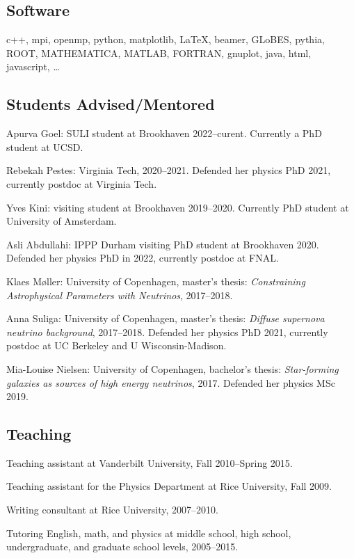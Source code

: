 \documentclass{article}
\renewenvironment{itemize}{
\begin{list}{}{
\setlength{\leftmargin}{.5em}}}{
\end{list}}
\begin{document}
\subsection*{Software}
\begin{itemize}
\item 
c++, mpi, openmp, python, matplotlib, \LaTeX, beamer, GLoBES, pythia, ROOT, MATHEMATICA, MATLAB, FORTRAN, gnuplot, java, html, javascript, \dots
\end{itemize}

\subsection*{Students Advised/Mentored}
\begin{itemize}
\item Apurva Goel: SULI student at Brookhaven 2022--curent.
Currently a PhD student at UCSD.
\item Rebekah Pestes: Virginia Tech, 2020--2021.
Defended her physics PhD 2021, currently postdoc at Virginia Tech.
\item Yves Kini: visiting student at Brookhaven 2019--2020.
Currently PhD student at University of Amsterdam.
\item Asli Abdullahi: IPPP Durham visiting PhD student at Brookhaven 2020.
Defended her physics PhD in 2022, currently postdoc at FNAL.
\item Klaes M\o ller: University of Copenhagen, master's thesis: \emph{Constraining Astrophysical Parameters with Neutrinos}, 2017--2018.
\item Anna Suliga: University of Copenhagen, master's thesis: \emph{Diffuse supernova neutrino background}, 2017--2018.
Defended her physics PhD 2021, currently postdoc at UC Berkeley and U Wisconsin-Madison.
\item Mia-Louise Nielsen: University of Copenhagen, bachelor's thesis: \emph{Star-forming galaxies as sources of high energy neutrinos}, 2017.
Defended her physics MSc 2019.
\end{itemize}

\subsection*{Teaching}
\begin{itemize}
\item Teaching assistant at Vanderbilt University, Fall 2010--Spring 2015.
\item Teaching assistant for the Physics Department at Rice University, Fall 2009.
\item Writing consultant at Rice University, 2007--2010.
\item Tutoring English, math, and physics at middle school, high school, undergraduate, and graduate school levels, 2005--2015.
\end{itemize}
\end{document}
